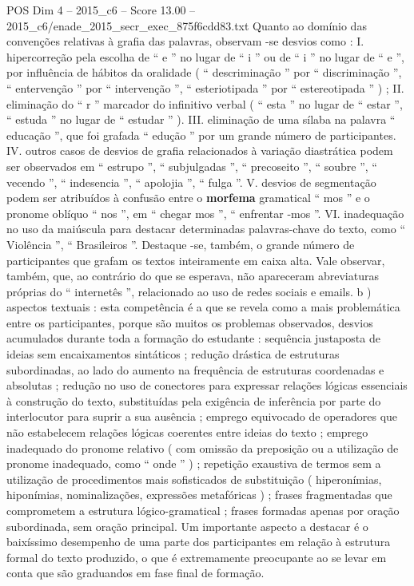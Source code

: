 \begin{textsample}{POS Dim 4 – 2015\_c6 – Score 13.00 – 2015\_c6/enade\_2015\_secr\_exec\_875f6cdd83.txt}
Quanto ao domínio das convenções relativas à grafia das palavras, observam -se desvios como : I. hipercorreção pela escolha de “ e ” no lugar de “ i ” ou de “ i ” no lugar de “ e ”, por influência de hábitos da oralidade ( “ descriminação ” por “ discriminação ”, “ entervenção ” por “ intervenção ”, “ esteriotipada ” por “ estereotipada ” ) ; II. eliminação do “ r ” marcador do infinitivo verbal ( “ esta ” no lugar de “ estar ”, “ estuda ” no lugar de “ estudar ” ).
III. eliminação de uma sílaba na palavra “ educação ”, que foi grafada “ edução ” por um grande número de participantes.
IV. outros casos de desvios de grafia relacionados à variação diastrática podem ser observados em “ estrupo ”, “ subjulgadas ”, “ precoseito ”, “ soubre ”, “ vecendo ”, “ indesencia ”, “ apolojia ”, “ fulga ”.
V. desvios de segmentação podem ser atribuídos à confusão entre o \textbf{morfema} gramatical “ mos ” e o pronome oblíquo “ nos ”, em “ chegar mos ”, “ enfrentar -mos ”.
VI. inadequação no uso da maiúscula para destacar determinadas palavras-chave do texto, como “ Violência ”, “ Brasileiros ”.
Destaque -se, também, o grande número de participantes que grafam os textos inteiramente em caixa alta.
Vale observar, também, que, ao contrário do que se esperava, não apareceram abreviaturas próprias do “ internetês ”, relacionado ao uso de redes sociais e emails. b ) aspectos textuais : esta competência é a que se revela como a mais problemática entre os participantes, porque são muitos os problemas observados, desvios acumulados durante toda a formação do estudante : sequência justaposta de ideias sem encaixamentos sintáticos ; redução drástica de estruturas subordinadas, ao lado do aumento na frequência de estruturas coordenadas e absolutas ; redução no uso de conectores para expressar relações lógicas essenciais à construção do texto, substituídas pela exigência de inferência por parte do interlocutor para suprir a sua ausência ; emprego equivocado de operadores que não estabelecem relações lógicas coerentes entre ideias do texto ; emprego inadequado do pronome relativo ( com omissão da preposição ou a utilização de pronome inadequado, como “ onde ” ) ; repetição exaustiva de termos sem a utilização de procedimentos mais sofisticados de substituição ( hiperonímias, hiponímias, nominalizações, expressões metafóricas ) ; frases fragmentadas que comprometem a estrutura lógico-gramatical ; frases formadas apenas por oração subordinada, sem oração principal.
Um importante aspecto a destacar é o baixíssimo desempenho de uma parte dos participantes em relação à estrutura formal do texto produzido, o que é extremamente preocupante ao se levar em conta que são graduandos em fase final de formação.

\end{textsample}
